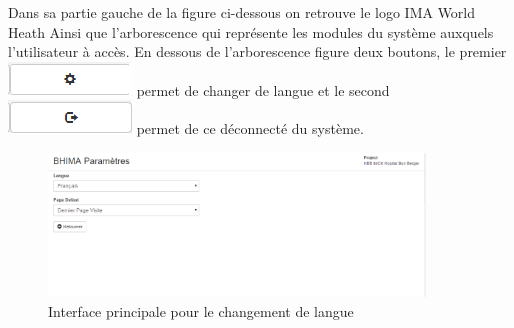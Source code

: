 \documentclass[12pt,a4paper]{report}
\begin{document}
Dans sa partie gauche de la figure ci-dessous on retrouve le logo IMA World Heath Ainsi que l'arborescence qui représente les modules du système auxquels l'utilisateur à accès. En dessous de l'arborescence figure deux boutons, le premier \includegraphics[scale=0.5]{pic/lang.png} permet de changer de langue et le second \includegraphics[scale=0.5]{pic/logout.png} permet de ce déconnecté du système.

\begin{figure}[h]
\begin{center}
\includegraphics[width=10cm]{pic/changeLang.png}
\end{center}
\caption{Interface principale pour le changement de langue}
\label{Interface principale pour le changement de langue}
\end{figure} 
\newpage
\end{document}
